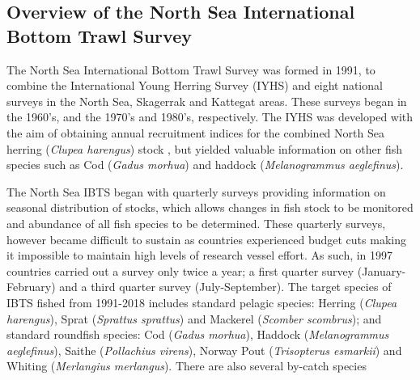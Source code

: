 \documentclass[a4paper 12pt]{article}
\numberwithin{equation}{section}
\begin{document}
\subsection{Overview of the North Sea International Bottom Trawl Survey}
\label{overview}
\indent The North Sea International Bottom Trawl Survey was formed in 1991, to combine the International Young Herring Survey (IYHS) and eight national surveys in the North Sea, Skagerrak and Kattegat areas. These surveys began in the 1960's, and the 1970's and 1980's, respectively. The IYHS was developed with the aim of obtaining annual recruitment indices for the combined North Sea herring (\textit{Clupea harengus}) stock \citep{ICES2012}, but yielded valuable information on other fish species such as Cod (\textit{Gadus morhua}) and haddock (\textit{Melanogrammus aeglefinus}).

\indent The North Sea IBTS began with quarterly surveys providing information on seasonal distribution of stocks, which allows changes in fish stock to be monitored and abundance of all fish species to be determined. These quarterly surveys, however became difficult to sustain as countries experienced budget cuts making it impossible to maintain high levels of research vessel effort. As such, in 1997 countries carried out a survey only twice a year; a first quarter survey (January-February) and a third quarter survey (July-September). The target species of IBTS fished from 1991-2018 includes standard pelagic species: Herring (\textit{Clupea harengus}), Sprat (\textit{Sprattus sprattus}) and Mackerel (\textit{Scomber scombrus}); and standard roundfish species: Cod (\textit{Gadus morhua}), Haddock (\textit{Melanogrammus aeglefinus}), Saithe (\textit{Pollachius virens}),  Norway Pout (\textit{Trisopterus esmarkii})  and Whiting (\textit{Merlangius merlangus}). There are also several by-catch species \citep{ICES2006Report}
\end{document}
